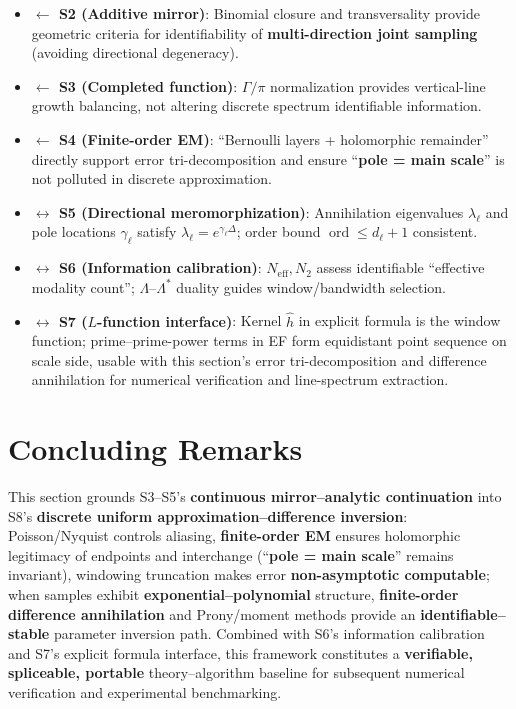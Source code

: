 \documentclass[11pt,a4paper]{article}
\theoremstyle{remark}
\DeclareMathOperator{\ord}{ord}
\begin{document}
\begin{itemize}
\item \textbf{$\leftarrow$ S2 (Additive mirror)}: Binomial closure and transversality provide geometric criteria for identifiability of \textbf{multi-direction joint sampling} (avoiding directional degeneracy).

\item \textbf{$\leftarrow$ S3 (Completed function)}: $\Gamma/\pi$ normalization provides vertical-line growth balancing, not altering discrete spectrum identifiable information.

\item \textbf{$\leftarrow$ S4 (Finite-order EM)}: ``Bernoulli layers + holomorphic remainder'' directly support error tri-decomposition and ensure ``\textbf{pole = main scale}'' is not polluted in discrete approximation.

\item \textbf{$\leftrightarrow$ S5 (Directional meromorphization)}: Annihilation eigenvalues $\lambda_\ell$ and pole locations $\gamma_\ell$ satisfy $\lambda_\ell=e^{\gamma_\ell\Delta}$; order bound $\ord\le d_\ell+1$ consistent.

\item \textbf{$\leftrightarrow$ S6 (Information calibration)}: $N_{\mathrm{eff}},N_2$ assess identifiable ``effective modality count''; $\Lambda$--$\Lambda^\ast$ duality guides window/bandwidth selection.

\item \textbf{$\leftrightarrow$ S7 ($L$-function interface)}: Kernel $\widehat{h}$ in explicit formula is the window function; prime--prime-power terms in EF form equidistant point sequence on scale side, usable with this section's error tri-decomposition and difference annihilation for numerical verification and line-spectrum extraction.
\end{itemize}

\section*{Concluding Remarks}

This section grounds S3--S5's \textbf{continuous mirror--analytic continuation} into S8's \textbf{discrete uniform approximation--difference inversion}: Poisson/Nyquist controls aliasing, \textbf{finite-order EM} ensures holomorphic legitimacy of endpoints and interchange (``\textbf{pole = main scale}'' remains invariant), windowing truncation makes error \textbf{non-asymptotic computable}; when samples exhibit \textbf{exponential--polynomial} structure, \textbf{finite-order difference annihilation} and Prony/moment methods provide an \textbf{identifiable--stable} parameter inversion path. Combined with S6's information calibration and S7's explicit formula interface, this framework constitutes a \textbf{verifiable, spliceable, portable} theory--algorithm baseline for subsequent numerical verification and experimental benchmarking.
\end{document}
